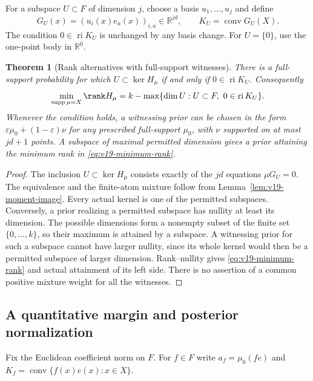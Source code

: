 \documentclass[11pt]{amsart}
\newtheorem{theorem}{Theorem}[section]
\theoremstyle{definition}\newtheorem{definition}[theorem]{Definition}
\theoremstyle{remark}\newtheorem{remark}[theorem]{Remark}
\newcommand{\R}{\mathbb R}\newcommand{\N}{\mathbb N}\newcommand{\C}{\mathbb C}
\begin{document}
For a subspace $U\subset F$ of dimension $j$, choose a basis
$u_1,\ldots,u_j$ and define
\[
 G_U(x)=(u_i(x)e_a(x))_{i,a}\in\R^{jd},\qquad
 K_U=\operatorname{conv}G_U(X).
\]
The condition $0\in\operatorname{ri}K_U$ is unchanged by any basis
change. For $U=\{0\}$, use the one-point body in $\R^0$.

\begin{theorem}[Rank alternatives with full-support witnesses]
\label{thm:v19-rank-alternative}
There is a full-support probability for which $U\subset\ker H_\mu$
if and only if $0\in\operatorname{ri}K_U$. Consequently
\begin{equation}\label{eq:v19-minimum-rank}
 \min_{\operatorname{supp}\mu=X}\rank H_\mu
 = k-\max\{\dim U:U\subset F,\ 0\in\operatorname{ri}K_U\}.
\end{equation}
Whenever the condition holds, a witnessing prior can be chosen in the
form $\varepsilon\mu_0+(1-\varepsilon)\nu$ for any prescribed
full-support $\mu_0$, with $\nu$ supported on at most $jd+1$ points.
A subspace of maximal permitted dimension gives a prior attaining the
minimum rank in \eqref{eq:v19-minimum-rank}.
\end{theorem}
\begin{proof}
The inclusion $U\subset\ker H_\mu$ consists exactly of the $jd$
equations $\mu G_U=0$. The equivalence and the finite-atom mixture
follow from Lemma~\ref{lem:v19-moment-image}. Every actual kernel is
one of the permitted subspaces. Conversely, a prior realizing a
permitted subspace has nullity at least its dimension. The possible
dimensions form a nonempty subset of the finite set $\{0,\ldots,k\}$,
so their maximum is attained by a subspace. A witnessing prior for
such a subspace cannot have larger nullity, since its whole kernel
would then be a permitted subspace of larger dimension. Rank--nullity
gives \eqref{eq:v19-minimum-rank} and actual attainment of its left
side. There is no assertion of a common positive mixture weight for
all the witnesses.
\end{proof}

\subsection{A quantitative margin and posterior normalization}
Fix the Euclidean coefficient norm on $F$. For $f\in F$ write
$a_f=\mu_0(f e)$ and $K_f=\operatorname{conv}\{f(x)e(x):x\in X\}$.
\end{document}
